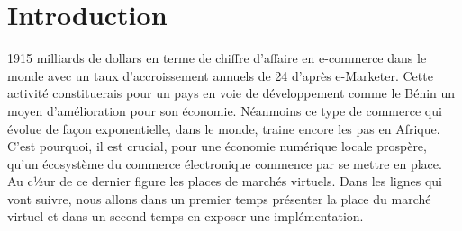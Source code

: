 \chapter{Introduction}

 1915 milliards de dollars en terme de chiffre d'affaire en e-commerce dans le monde avec un taux d'accroissement annuels de 24 d'après e-Marketer. Cette activité constituerais pour un pays en voie de développement comme le Bénin un moyen d'amélioration pour son économie. Néanmoins ce type de commerce qui évolue de façon exponentielle, dans le monde, traine encore les pas en Afrique. C'est pourquoi, il est crucial, pour une économie numérique locale prospère, qu'un écosystème du commerce électronique commence par se mettre en place. Au c½ur de ce dernier figure les places de marchés virtuels. Dans les lignes qui vont suivre, nous allons dans un premier temps présenter la place du marché virtuel et dans un second temps en exposer une implémentation. 
 